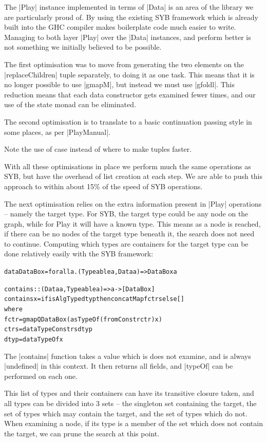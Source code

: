 \documentclass[preprint]{sigplanconf}
\newenvironment{code}{\begin{alltt}\small}{\end{alltt}}
\begin{document}
The |Play| instance implemented in terms of |Data| is an area of the library we are particularly proud of. By using the existing SYB framework which is already built into the GHC compiler makes boilerplate code much easier to write. Managing to both layer |Play| over the |Data| instances, and perform better is not something we initially believed to be possible.

The first optimisation was to move from generating the two elements on the |replaceChildren| tuple separately, to doing it as one task. This means that it is no longer possible to use |gmapM|, but instead we must use |gfoldl|. This reduction means that each data constructor gets examined fewer times, and our use of the state monad can be eliminated.

The second optimisation is to translate to a basic continuation passing style in some places, as per |PlayManual|.

Note the use of case instead of where to make tuples faster.

With all these optimisations in place we perform much the same operations as SYB, but have the overhead of list creation at each step. We are able to push this approach to within about 15\% of the speed of SYB operations.

The next optimisation relies on the extra information present in |Play| operations -- namely the target type. For SYB, the target type could be any node on the graph, while for Play it will have a known type. This means as a node is reached, if there can be no nodes of the target type beneath it, the search does not need to continue. Computing which types are containers for the target type can be done relatively easily with the SYB framework:

\begin{code}
data DataBox = forall a . (Typeable a, Data a) => DataBox a

contains :: (Data a, Typeable a) => a -> [DataBox]
contains x = if isAlgType dtyp then concatMap f ctrs else []
    where
        f ctr = gmapQ DataBox (asTypeOf (fromConstr ctr) x)
        ctrs = dataTypeConstrs dtyp
        dtyp = dataTypeOf x
\end{code}

The |contains| function takes a value which is does not examine, and is always |undefined| in this context. It then returns all fields, and |typeOf| can be performed on each one.

This list of types and their containers can have its transitive closure taken, and all types can be divided into 3 sets -- the singleton set containing the target, the set of types which may contain the target, and the set of types which do not. When examining a node, if its type is a member of the set which does not contain the target, we can prune the search at this point.
\end{document}
